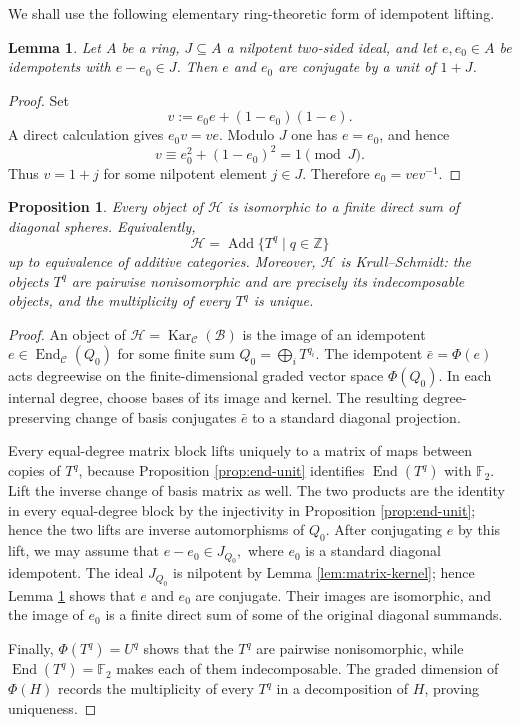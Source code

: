 \documentclass[11pt]{amsart}
\numberwithin{equation}{section}
\newtheorem{proposition}[theorem]{Proposition}
\newtheorem{lemma}[theorem]{Lemma}
\theoremstyle{definition}
\theoremstyle{remark}
\DeclareMathOperator{\End}{End}
\DeclareMathOperator{\Kar}{Kar}
\DeclareMathOperator{\Add}{Add}
\newcommand{\F}{\mathbb F_2}
\newcommand{\C}{\mathcal C}
\newcommand{\Hh}{\mathcal H}
\newcommand{\B}{\mathcal B}
\begin{document}
We shall use the following elementary ring-theoretic form of idempotent
lifting.

\begin{lemma}
\label{lem:idempotent-conjugacy}
Let $A$ be a ring, $J\subseteq A$ a nilpotent two-sided ideal, and let
$e,e_0\in A$ be idempotents with $e-e_0\in J$.  Then $e$ and $e_0$ are
conjugate by a unit of $1+J$.
\end{lemma}

\begin{proof}
Set
\[
  v:=e_0e+(1-e_0)(1-e).
\]
A direct calculation gives $e_0v=ve$.  Modulo $J$ one has $e=e_0$, and hence
\[
  v\equiv e_0^2+(1-e_0)^2=1\pmod J.
\]
Thus $v=1+j$ for some nilpotent element $j\in J$. Therefore
$e_0=vev^{-1}$.
\end{proof}

\begin{proposition}
\label{prop:no-exotic-retracts}
Every object of $\Hh$ is isomorphic to a finite direct sum of diagonal
spheres.  Equivalently,
\[
  \Hh=\Add\{T^q\mid q\in\mathbb Z\}
\]
up to equivalence of additive categories.  Moreover, $\Hh$ is
Krull--Schmidt: the objects $T^q$ are pairwise nonisomorphic and are precisely
its indecomposable objects, and the multiplicity of every $T^q$ is unique.
\end{proposition}

\begin{proof}
An object of $\Hh=\Kar_{\C}(\B)$ is the image of an idempotent
$e\in\End_{\C}(Q_0)$ for some finite sum
$Q_0=\bigoplus_iT^{q_i}$.  The idempotent
$\bar e=\Phi(e)$ acts degreewise on the finite-dimensional graded vector
space $\Phi(Q_0)$.  In each internal degree, choose bases of its image and
kernel.  The resulting degree-preserving change of basis conjugates
$\bar e$ to a standard diagonal projection.

Every equal-degree matrix block lifts uniquely to a matrix of maps between
copies of $T^q$, because Proposition \ref{prop:end-unit} identifies
$\End(T^q)$ with $\F$.  Lift the inverse change of basis matrix as well.
The two products are the identity in every equal-degree block by the
injectivity in Proposition \ref{prop:end-unit}; hence the two lifts are inverse
automorphisms of $Q_0$.  After conjugating $e$ by this lift, we may assume
that $e-e_0\in J_{Q_0},$
where $e_0$ is a standard diagonal idempotent.  The ideal $J_{Q_0}$ is
nilpotent by Lemma \ref{lem:matrix-kernel}; hence Lemma 
\ref{lem:idempotent-conjugacy} shows that $e$ and $e_0$ are conjugate.
Their images are isomorphic, and the image of $e_0$ is a finite direct sum of
some of the original diagonal summands.

Finally, $\Phi(T^q)=U^q$ shows that the $T^q$ are pairwise nonisomorphic,
while $\End(T^q)=\F$ makes each of them indecomposable.  The graded dimension
of $\Phi(H)$ records the multiplicity of every $T^q$ in a decomposition of
$H$, proving uniqueness.
\end{proof}
\end{document}
